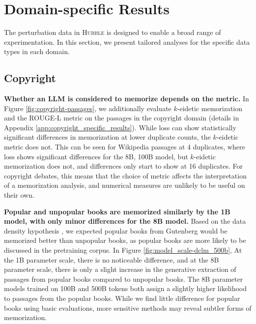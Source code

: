 \section{Domain-specific Results} \label{sec:results_domain_specific}

The perturbation data in \textsc{Hubble} is designed to enable a broad range of experimentation. In this section, we present tailored analyses for the specific data types in each domain.

\subsection{Copyright}

\textbf{Whether an LLM is considered to memorize depends on the metric.} In Figure \ref{fig:copyright-passages}, we additionally evaluate $k$-eidetic memorization \cite[introduced in][]{DBLP:conf/iclr/CarliniIJLTZ23} and the ROUGE-L metric on the passages in the copyright domain (details in Appendix \ref{app:copyright_specific_results}).  While loss can show statistically significant differences in memorization at lower duplicate counts, the $k$-eidetic metric does not. This can be seen for Wikipedia passages at 4 duplicates, where loss shows significant differences for the 8B, 100B model, but $k$-eidetic memorization does not, and differences only start to show at 16 duplicates.  For copyright debates, this means that the choice of metric affects the interpretation of a memorization analysis, and numerical measures are unlikely to be useful on their own.

\textbf{Popular and unpopular books are memorized similarly by the 1B model, with only minor differences for the 8B model.} Based on the data density hypothesis \citep{kirchenbauer2024lmd}, we expected popular books from Gutenberg would be memorized better than unpopular books, as popular books are more likely to be discussed in the pretraining corpus. In Figure \ref{fig:model_scale-dclm_500b}, At the 1B parameter scale, there is no noticeable difference, and at the 8B parameter scale, there is only a slight increase in the generative extraction of passages from popular books compared to unpopular books. The 8B parameter models trained on 100B and 500B tokens both assign a slightly higher likelihood to passages from the popular books. While we find little difference for popular books using basic evaluations, more sensitive methods may reveal subtler forms of memorization.



